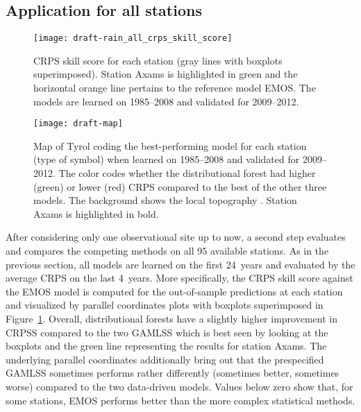 \documentclass[aoas, preprint]{imsart}
\numberwithin{equation}{subsection}
\begin{document}

\subsection{Application for all stations}
\label{sec:all}


\begin{figure}[t!]
\centering
{}
\texttt{[image: draft-rain\_all\_crps\_skill\_score]}
\caption{\label{fig:all-crps}CRPS skill score for each station (gray lines
with boxplots superimposed). Station Axams is highlighted in green 
and the horizontal orange line pertains to the reference model EMOS. The models are 
learned on 1985--2008 and validated for 2009--2012.}
\end{figure}

\begin{figure}[t!]
\centering
{}
\texttt{[image: draft-map]}
\caption{\label{fig:all-map}Map of Tyrol coding the best-performing model
for each station (type of symbol) when learned on 1985--2008 and validated for 2009--2012.
The color codes whether the distributional 
forest had higher (green) or lower (red) CRPS compared to the best of the 
other three models. The background shows the local topography \citep{Robinson:2014}.
Station Axams is highlighted in bold.}
\end{figure}


After considering only one observational site up to now, a second step
evaluates and compares the competing methods on all 95 available stations. As in the previous
section, all models are learned on the first 24~years and evaluated by the
average CRPS on the last 4~years. More specifically, the CRPS skill score
against the EMOS model is computed for the out-of-sample predictions at each
station and visualized by parallel coordinates plots with boxplots superimposed
in Figure~\ref{fig:all-crps}. Overall, distributional forests have a slightly
higher improvement in CRPSS compared to the two GAMLSS which is best seen
by looking at the boxplots and the green line representing the results
for station Axams. The underlying parallel coordinates additionally
bring out that the prespecified GAMLSS sometimes performs rather differently
(sometimes better, sometimes worse) compared to the two data-driven models.
Values below zero show that, for some stations, EMOS performs better
than the more complex statistical methods.
\end{document}
